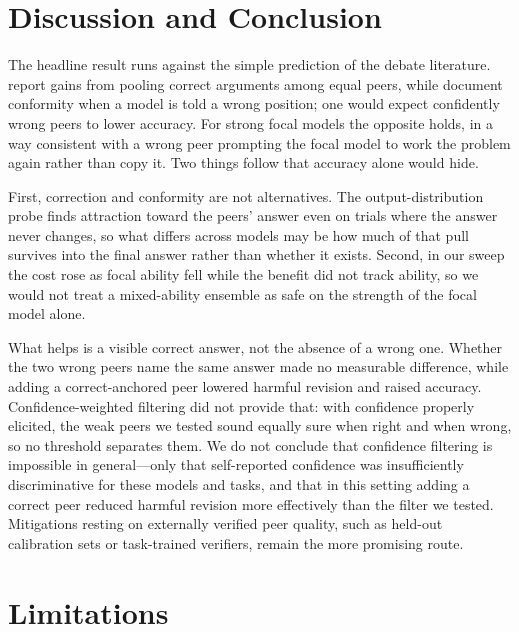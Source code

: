 \documentclass[11pt]{article}
\begin{document}
\section{Discussion and Conclusion}
\label{sec:discussion}

The headline result runs against the simple prediction of the debate
literature.
\citet{du2023improving} report gains from pooling correct arguments among
equal peers, while \citet{koo2024benchmarking,sharma2023towards} document
conformity when a model is told a wrong position; one would expect confidently
wrong peers to lower accuracy.
For strong focal models the opposite holds, in a way consistent with a wrong
peer prompting the focal model to work the problem again rather than copy it.
Two things follow that accuracy alone would hide.

First, correction and conformity are not alternatives.
The output-distribution probe finds attraction toward the peers' answer even on
trials where the answer never changes, so what differs across models may be how
much of that pull survives into the final answer rather than whether it exists.
Second, in our sweep the cost rose as focal ability fell while the benefit did
not track ability, so we would not treat a mixed-ability ensemble as safe on
the strength of the focal model alone.

What helps is a visible correct answer, not the absence of a wrong one.
Whether the two wrong peers name the same answer made no measurable difference,
while adding a correct-anchored peer lowered harmful revision and raised
accuracy.
Confidence-weighted filtering did not provide that: with confidence properly
elicited, the weak peers we tested sound equally sure when right and when
wrong, so no threshold separates them.
We do not conclude that confidence filtering is impossible in general---only
that self-reported confidence was insufficiently discriminative for these
models and tasks, and that in this setting adding a correct peer reduced
harmful revision more effectively than the filter we tested.
Mitigations resting on externally verified peer quality, such as held-out
calibration sets or task-trained verifiers, remain the more promising route.

\section*{Limitations}
\label{sec:limitations}
\end{document}
